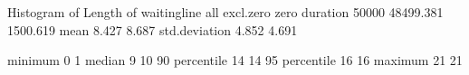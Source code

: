 \documentclass[letterpaper,10pt,english]{sphinxmanual}
\begin{document}
%
\begin{sphinxVerbatim}[commandchars=\\\{\}]
Histogram of Length of waitingline
                        all    excl.zero         zero
\PYGZhy{}\PYGZhy{}\PYGZhy{}\PYGZhy{}\PYGZhy{}\PYGZhy{}\PYGZhy{}\PYGZhy{}\PYGZhy{}\PYGZhy{}\PYGZhy{}\PYGZhy{}\PYGZhy{}\PYGZhy{} \PYGZhy{}\PYGZhy{}\PYGZhy{}\PYGZhy{}\PYGZhy{}\PYGZhy{}\PYGZhy{}\PYGZhy{}\PYGZhy{}\PYGZhy{}\PYGZhy{}\PYGZhy{} \PYGZhy{}\PYGZhy{}\PYGZhy{}\PYGZhy{}\PYGZhy{}\PYGZhy{}\PYGZhy{}\PYGZhy{}\PYGZhy{}\PYGZhy{}\PYGZhy{}\PYGZhy{} \PYGZhy{}\PYGZhy{}\PYGZhy{}\PYGZhy{}\PYGZhy{}\PYGZhy{}\PYGZhy{}\PYGZhy{}\PYGZhy{}\PYGZhy{}\PYGZhy{}\PYGZhy{}
duration          50000        48499.381     1500.619
mean                  8.427        8.687
std.deviation         4.852        4.691

minimum               0            1
median                9           10
90\PYGZpc{} percentile       14           14
95\PYGZpc{} percentile       16           16
maximum              21           21


\end{sphinxVerbatim}
\end{document}

